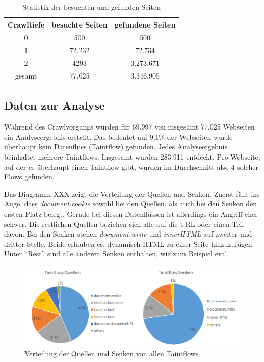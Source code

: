 \begin{table}
\centering
\begin{tabular}{|c|c|c|}
	\hline 
	Crawltiefe & besuchte Seiten & gefundene Seiten \\ 
	\hline 
	0 & 500 & 500 \\ 
	\hline 
	1 & 72.232 & 72.734 \\ 
	\hline 
	2 & 4293 & 3.273.671 \\ 
	\hline 
	\hline
	gesamt  & 77.025 & 3.346.905 \\ 
	\hline 
\end{tabular} 
\caption{Statistik der besuchten und gefunden Seiten}
\end{table}

\subsection{Daten zur Analyse}
Während des Crawlvorgangs wurden für 69.997 von insgesamt 77.025 Webseiten ein Analyseergebnis erstellt. Das bedeutet auf 9,1\% der Webseiten wurde überhaupt kein Datenfluss (Taintflow) gefunden. Jedes Analyseergebnis beinhaltet mehrere Taintflows. Insgesamt wurden 283.911 entdeckt. Pro Webseite, auf der es überhaupt einen Taintflow gibt, wurden im Durchschnitt also 4 solcher Flows gefunden. 

Das Diagramm XXX zeigt die Verteilung der Quellen und Senken. Zuerst fällt ins Auge, dass \textit{document.cookie} sowohl bei den Quellen, als auch bei den Senken den ersten Platz belegt. Gerade bei diesen Datenflüssen ist allerdings ein Angriff eher schwer. Die restlichen Quellen beziehen sich alle auf die URL oder einen Teil davon. Bei den Senken stehen \textit{document.write} und \textit{innerHTML} auf zweiter und dritter Stelle. Beide erlauben es, dynamisch HTML zu einer Seite hinzuzufügen. Unter \enquote{Rest} sind alle anderen Senken enthalten, wie zum Beispiel eval. 

\begin{figure}[h]
	\centering
	\includegraphics[width=1\textwidth]{Bilder/Diagram1.png}
	\caption{Verteilung der Quellen und Senken von allen Taintflows}
\end{figure}

